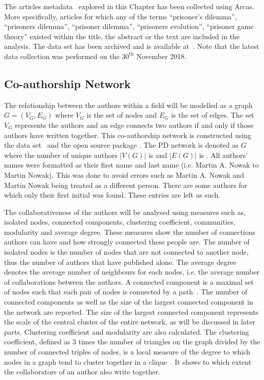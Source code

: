 The \totalarticles articles metadata~\cite{pd_data_2018} explored in this Chapter has been collected
using Arcas. More specifically, articles for which any of the terms
``prisoner's dilemma'', ``prisoners dilemma'', ``prisoner dilemma'', ``prisoners
evolution'', ``prisoner game theory'' existed within the title, the abstract or
the text are included in the analysis. The data set has been archived and is
available at~\cite{pd_data_2018}. Note that the latest data collection was
performed on the \(30^{\text{th}}\) November 2018.

\subsection{Co-authorship Network}\label{section:co_authorship_network}

The relationship between the authors within a field will be modelled as a graph
\(G = (V_G, E_G)\) where \(V_G\) is the set of nodes and \(E_G\)  is the set of
edges. The set \(V_G\) represents the authors and an edge connects two authors
if and only if those authors have written together. This co-authorship network is
constructed using the data set~\cite{pd_data_2018} and the open source package
\cite{networkx}. The PD network is denoted as \(G\) where the
number of unique authors \(|V(G)|\) is \authors and \(|E(G)|\) is \edges.
All authors' names were formatted as their first name and last name (i.e.
Martin A. Nowak to Martin Nowak). This was done to avoid errors such as Martin
A. Nowak and Martin Nowak being treated as a different person. There are some
authors for which only their first initial was found. These entries are left as
such.

The collaborativeness of the authors will be analysed using measures such as, isolated nodes,
connected components, clustering coefficient, communities, modularity and average degree.
These measures show the number of connections authors can have
and how strongly connected these people are. The number of isolated nodes is the
number of nodes that are not connected to another node, thus the
number of authors that have published alone. The average degree denotes the average
number of neighbours for each nodes, i.e. the average number of collaborations
between the authors.
A connected component is a maximal set of nodes such that each pair of nodes is
connected by a path~\cite{Easley2010}. The number of connected components as well as the size of the
largest connected component in the network are reported.
The size of the largest connected component represents the scale of the central cluster
of the entire network, as will be discussed in later parts.
Clustering coefficient and modularity are also calculated. The clustering
coefficient, defined as 3 times the number of triangles on the graph divided
by the number of connected triples of nodes, is a local measure of the degree to
which nodes in a graph tend to cluster together
in a clique~\cite{Easley2010}. It shows to which extent the collaborators
of an author also write together.

